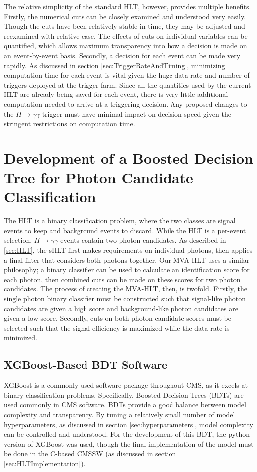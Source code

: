 \documentclass[12pt]{ucsddissertation}
\begin{document}
The relative simplicity of the standard HLT, however, provides multiple benefits. Firstly, the numerical cuts can be closely examined and understood very easily. Though the cuts have been relatively stable in time, they may be adjusted and reexamined with relative ease. The effects of cuts on individual variables can be quantified, which allows maximum transparency into how a decision is made on an event-by-event basis. Secondly, a decision for each event can be made very rapidly. As discussed in section \ref{sec:TriggerRateAndTiming}, minimizing computation time for each event is vital given the huge data rate and number of triggers deployed at the trigger farm. Since all the quantities used by the current HLT are already being saved for each event, there is very little additional computation needed to arrive at a triggering decision. Any proposed changes to the $H\rightarrow\gamma\gamma$ trigger must have minimal impact on decision speed given the stringent restrictions on computation time.

\section{Development of a Boosted Decision Tree for Photon Candidate Classification}
The HLT is a binary classification problem, where the two classes are signal events to keep and background events to discard. While the HLT is a per-event selection, $H \rightarrow \gamma\gamma$ events contain two photon candidates. As described in \ref{sec:HLT}, the sHLT first makes requirements on individual photons, then applies a final filter that considers both photons together. Our MVA-HLT uses a similar philosophy; a binary classifier can be used to calculate an identification score for each photon, then combined cuts can be made on these scores for two photon candidates. The process of creating the MVA-HLT, then, is twofold. Firstly, the single photon binary classifier must be constructed such that signal-like photon candidates are given a high score and background-like photon candidates are given a low score. Secondly, cuts on both photon candidate scores must be selected such that the signal efficiency is maximized while the data rate is minimized.
\subsection{XGBoost-Based BDT Software}\label{sec:HLTXGBInfo}
XGBoost is a commonly-used software package throughout CMS, as it excels at binary classification problems. Specifically, Boosted Decision Trees (BDTs) are used commonly in CMS software. BDTs provide a good balance between model complexity and transparency. By tuning a relatively small number of model hyperparameters, as discussed in section \ref{sec:hyperparameters}, model complexity can be controlled and understood. For the development of this BDT, the python version of XGBoost was used, though the final implementation of the model must be done in the C-based CMSSW (as discussed in section \ref{sec:HLTImplementation}). 
\end{document}
